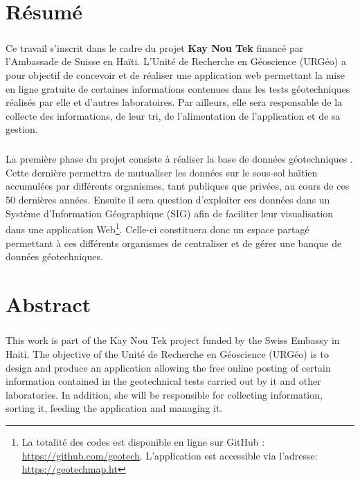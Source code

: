 \chapter*{Résumé}
\paragraph{}
Ce travail s'inscrit dans le cadre du projet \textbf{Kay Nou Tek}
financé par l’Ambassade de Suisse en Haïti. 
L'Unité de Recherche en Géoscience (URGéo) a pour objectif de concevoir et de réaliser
une application web permettant la mise en 
ligne gratuite de certaines informations contenues dans les tests 
géotechniques réalisés par elle et d’autres laboratoires.
Par ailleurs, elle sera responsable de la collecte des informations, de leur tri, de l’alimentation 
de l’application et de sa gestion. 
\paragraph{}
La première phase du projet consiste à réaliser la base de données géotechniques
. Cette dernière permettra de mutualiser les données 
 sur le sous-sol haïtien accumulées par différents organismes, tant publiques que privées, 
 au cours de ces 50 dernières années. Ensuite il sera question d'exploiter ces 
 données dans un Système d'Information Géographique (SIG)  afin de faciliter leur visualisation 
 dans une application
 Web\footnote{ 
    La totalité des codes est disponible en ligne sur GitHub : 
    \url{https://github.com/geotech}.
    L’application est accessible via l’adresse: 
    \url{https://geotechmap.ht}
 }. Celle-ci
 constituera donc un espace 
 partagé permettant à ces différents organismes de centraliser et de gérer une banque 
 de données géotechniques.


\newpage
\chapter*{Abstract}
\paragraph{}
This work is part of the Kay Nou Tek project funded by the Swiss 
Embassy in Haiti. The objective of the Unité de Recherche en Géoscience (URGéo) 
is to design and produce an application allowing the free online posting 
of certain information contained in the geotechnical tests carried out by 
it and other laboratories. In addition, she will be responsible for collecting 
information, sorting it, feeding the application and managing it.
